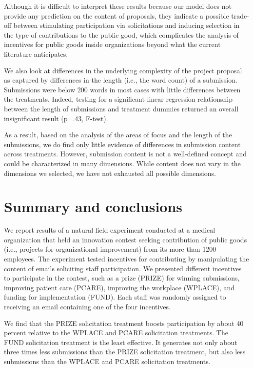 \documentclass[11pt, titlepage]{article}
\begin{document}
Although it is difficult to interpret these results because our model
does not provide any prediction on the content of proposals, they
indicate a possible trade-off between stimulating participation via
solicitations and inducing selection in the type of contributions to the
public good, which complicates the analysis of incentives for public
goods inside organizations beyond what the current literature
anticipates.

We also look at differences in the underlying complexity of the project
proposal as captured by differences in the length (i.e., the word count)
of a submission. Submissions were below 200 words in most cases with
little differences between the treatments. Indeed, testing for a
significant linear regression relationship between the length of
submissions and treatment dummies returned an overall insignificant
result (p=.43, F-test).

As a result, based on the analysis of the areas of focus and the length
of the submissions, we do find only little evidence of differences in
submission content across treatments. However, submission content is not
a well-defined concept and could be characterized in many dimensions.
While content does not vary in the dimensions we selected, we have not
exhausted all possible dimensions.

\section{Summary and conclusions}\label{summary-and-conclusions}

We report results of a natural field experiment conducted at a medical
organization that held an innovation contest seeking contribution of
public goods (i.e., projects for organizational improvement) from its
more than 1200 employees. The experiment tested incentives for
contributing by manipulating the content of emails soliciting staff
participation. We presented different incentives to participate in the
contest, such as a prize (PRIZE) for winning submissions, improving
patient care (PCARE), improving the workplace (WPLACE), and funding for
implementation (FUND). Each staff was randomly assigned to receiving an
email containing one of the four incentives.

We find that the PRIZE solicitation treatment boosts participation by
about 40 percent relative to the WPLACE and PCARE solicitation
treatments. The FUND solicitation treatment is the least effective. It
generates not only about three times less submissions than the PRIZE
solicitation treatment, but also less submissions than the WPLACE and
PCARE solicitation treatments.
\end{document}
